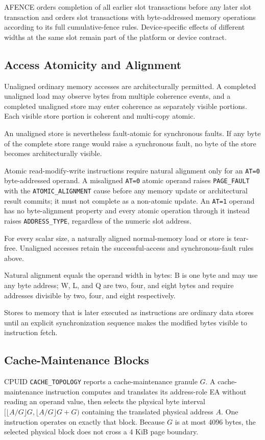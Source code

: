 AFENCE orders completion of all earlier slot transactions before any later slot transaction and orders slot
transactions with byte-addressed memory operations according to its full cumulative-fence rules. Device-specific
effects of different widths at the same slot remain part of the platform or device contract.

\subsection{Access Atomicity and Alignment}
Unaligned ordinary memory accesses are architecturally permitted. A completed unaligned load may observe bytes from
multiple coherence events, and a completed unaligned store may enter coherence as separately visible portions. Each
visible store portion is coherent and multi-copy atomic.

An unaligned store is nevertheless fault-atomic for synchronous faults. If any byte of the complete store range
would raise a synchronous fault, no byte of the store becomes architecturally visible.

Atomic read-modify-write instructions require natural alignment only for an \texttt{AT=0} byte-addressed operand.
A misaligned \texttt{AT=0} atomic operand raises \texttt{PAGE\_FAULT} with the \texttt{ATOMIC\_ALIGNMENT} cause
before any memory update or architectural result commits; it must not complete as a non-atomic update. An
\texttt{AT=1} operand has no byte-alignment property and every atomic operation through it instead raises
\texttt{ADDRESS\_TYPE}, regardless of the numeric slot address.

For every scalar size, a naturally aligned normal-memory load or store is tear-free. Unaligned accesses retain the
successful-access and synchronous-fault rules above.

Natural alignment equals the operand width in bytes: B is one byte and may use any byte address; W, L, and Q are
two, four, and eight bytes and require addresses divisible by two, four, and eight respectively.

Stores to memory that is later executed as instructions are ordinary data stores until an explicit synchronization
sequence makes the modified bytes visible to instruction fetch.

\subsection{Cache-Maintenance Blocks}
CPUID \texttt{CACHE\_TOPOLOGY} reports a cache-maintenance granule $G$. A cache-maintenance instruction computes and
translates its address-role EA without reading an operand value, then selects the physical byte interval
$[\lfloor A/G\rfloor G,\lfloor A/G\rfloor G+G)$ containing the translated physical address $A$. One instruction
operates on exactly that block. Because $G$ is at most 4096 bytes, the selected physical block does not cross a
4 KiB page boundary.

